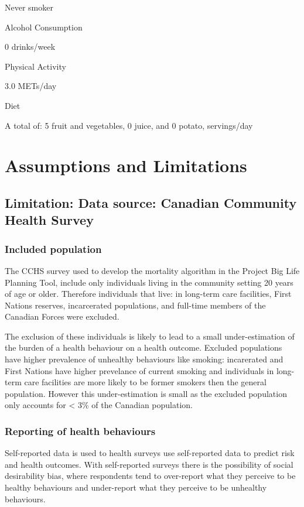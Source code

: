 \documentclass[]{book}
\begin{document}
Never smoker

Alcohol Consumption

0 drinks/week

Physical Activity

3.0 METs/day

Diet

A total of: 5 fruit and vegetables, 0 juice, and 0 potato, servings/day

\section{Assumptions and Limitations}\label{assumptions-and-limitations}

\subsection{Limitation: Data source: Canadian Community Health
Survey}\label{limitation-data-source-canadian-community-health-survey}

\subsubsection{Included population}\label{included-population}

The CCHS survey used to develop the mortality algorithm in the Project
Big Life Planning Tool, include only individuals living in the community
setting 20 years of age or older. Therefore individuals that live: in
long-term care facilities, First Nations reserves, incarcerated
populations, and full-time members of the Canadian Forces were excluded.

The exclusion of these individuals is likely to lead to a small
under-estimation of the burden of a health behaviour on a health
outcome. Excluded populations have higher prevalence of unhealthy
behaviours like smoking: incarerated and First Nations have higher
prevelance of current smoking and individuals in long-term care
facilities are more likely to be former smokers then the general
population. However this under-estimation is small as the excluded
population only accounts for \textless{} 3\% of the Canadian population.

\subsubsection{Reporting of health
behaviours}\label{reporting-of-health-behaviours}

Self-reported data is used to health surveys use self-reported data to
predict risk and health outcomes. With self-reported surveys there is
the possibility of social desirability bias, where respondents tend to
over-report what they perceive to be healthy behaviours and under-report
what they perceive to be unhealthy behaviours.
\end{document}

